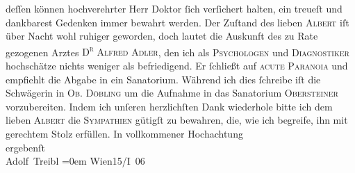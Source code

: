 \begin{ledgroupsized}[t]{13cm}
               deſſen können hochverehrter Herr Doktor ſich verſichert halten, ein treueſt und
               dankbarest Gedenken immer bewahrt werden.\pend
           \pstart
           Der Zuſtand des lieben \textsc{Albert} iſt über Nacht wohl ruhiger geworden, doch lautet {\pb}die Auskunft des zu Rate gezogenen Arztes \textsc{D\textsuperscript{r}{ }Alfred Adler}, den ich als \textsc{Psychologen} und \textsc{Diagnostiker} hochschätze nichts weniger als befriedigend. Er ſchließt auf
                  \textsc{acute Paranoia} und empfiehlt die Abgabe in ein
               Sanatorium.\pend
           \pstart
           Während ich dies ſchreibe iſt die Schwägerin in \textsc{Ob. Döbling} um die Aufnahme in das Sanatorium \textsc{Obersteiner} vorzubereiten.\pend
           \pstart
           Indem ich unſeren herzlichſten Dank wiederhole {\pb}bitte
               ich dem lieben \textsc{Albert} die \textsc{Sympathien} gütigſt zu bewahren, die, wie ich
               begreife, ihn mit gerechtem Stolz erfüllen.\pend
           \pstart
           In vollkommener Hochachtung{\\[\baselineskip]}ergebenſt{\\[\baselineskip]}\spacefill\mbox{Adolf Treibl}\pend
           \leftskip=0em{}\pstart
           Wien15/I 06\pend
           
         
         \endnumbering{}\end{ledgroupsized}  \newcommand{\dateiname}{L01572}\newcommand{\titel}{Adolf Treibl an Arthur Schnitzler, 15. 1. 1906}\newcommand{\editorInnen}{Martin Anton Müller und Gerd-Hermann Susen}
      